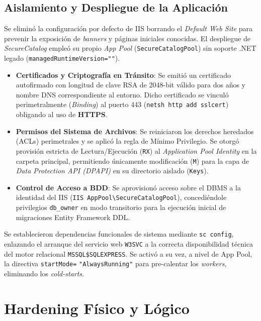 \subsection{Aislamiento y Despliegue de la Aplicación}
Se eliminó la configuración por defecto de IIS borrando el \textit{Default Web Site} para prevenir la exposición de \textit{banners} y páginas iniciales conocidas. El despliegue de \textit{SecureCatalog} empleó su propio \textit{App Pool} (\texttt{Secure}\allowbreak\texttt{CatalogPool}) sin soporte .NET legado (\texttt{managed}\allowbreak\texttt{Runtime}\allowbreak\texttt{Version=""}).

\begin{itemize}
    \item \textbf{Certificados y Criptografía en Tránsito}: Se emitió un certificado autofirmado con longitud de clave RSA de 2048-bit válido para dos años y nombre DNS correspondiente al entorno. Dicho certificado se vinculó perimetralmente (\textit{Binding}) al puerto 443 (\texttt{netsh http add sslcert}) obligando al uso de \textbf{HTTPS}.
    \item \textbf{Permisos del Sistema de Archivos}: Se reiniciaron los derechos heredados (ACLs) perimetrales y se aplicó la regla de Mínimo Privilegio. Se otorgó provisión estricta de Lectura/Ejecución (\texttt{RX}) al \textit{Application Pool Identity} en la carpeta principal, permitiendo únicamente modificación (\texttt{M}) para la capa de \textit{Data Protection API (DPAPI)} en su directorio aislado (\texttt{Keys}).
    \item \textbf{Control de Acceso a BDD}: Se aprovisionó acceso sobre el DBMS a la identidad del IIS (\texttt{IIS AppPool\textbackslash SecureCatalogPool}), concediéndole privilegios \texttt{db\_owner} en modo transitorio para la ejecución inicial de migraciones Entity Framework DDL.
\end{itemize}

Se establecieron dependencias funcionales de sistema mediante \texttt{sc config}, enlazando el arranque del servicio web \texttt{W3SVC} a la correcta disponibilidad técnica del motor relacional \texttt{MSSQL\$SQLEXPRESS}. Se activó a su vez, a nivel de App Pool, la directiva \texttt{startMode=} \texttt{"AlwaysRunning"} para pre-calentar los \textit{workers}, eliminando los \textit{cold-starts}.

\section[Hardening Físico y Lógico]{Hardening Físico y Lógico}
\label{sec:hardening_fisico_logico}

